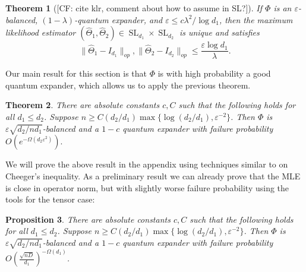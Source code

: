 \documentclass{article}
\newtheorem{theorem}{Theorem}
\newtheorem{prop}[theorem]{Proposition}
\newcommand\eps{\varepsilon}
\newcommand\SL{\operatorname{SL}}
\newcommand{\CF}[1]{{\color{purple}[CF: #1]}}
\begin{document}
\begin{theorem}[\CF{cite klr, comment about how to assume in SL?}]\label{thm:klr}
If $\Phi$ is an $\eps$-balanced, $(1 - \lambda)$-quantum expander, and $\eps \leq c \lambda^2/\log d_1$, then the maximum likelihood estimator $(\widehat{\Theta}_1, \widehat{\Theta}_2) \in \SL_{d_1}\times \SL_{d_2}$ is unique and satisfies
$$\| \widehat{\Theta}_1 - I_{d_1}\|_{op}, \| \widehat{\Theta}_2 - I_{d_2}\|_{op} \leq \frac{\eps \log d_1}{\lambda}.$$
\end{theorem}
Our main result for this section is that $\Phi$ is with high probability a good quantum expander, which allows us to apply the previous theorem. 

\begin{theorem}\label{thm:operator-cheeger}
There are absolute constants $c, C$ such that the following holds for all $d_1 \leq d_2$. Suppose $n \geq C (d_2/d_1) \max\{\log (d_2/d_1),  \eps^{-2}\} $. Then $\Phi$ is $\eps \sqrt{d_2/n d_1}$-balanced and a $1 - c$ quantum expander with failure probability $O(e^{ - \Omega( d_2 \eps^2)}).$
\end{theorem}

We will prove the above result in the appendix using techniques similar to \cite{FM20} on Cheeger's inequality. As a preliminary result we can already prove that the MLE is close in operator norm, but with slightly worse failure probability using the tools for the tensor case:

\begin{prop} \label{thm: operator-Pisier}
There are absolute constants $c, C$ such that the following holds for all $d_1 \leq d_2$. Suppose $n \geq C (d_2/d_1) \max\{\log (d_2/d_1),  \eps^{-2}\} $. Then $\Phi$ is $\eps \sqrt{d_2/n d_1}$-balanced and a $1 - c$ quantum expander with failure probability $O \left(\frac {\sqrt{nD}}{d_1}\right)^{ - \Omega(d_1)}$. 
\end{prop}
\end{document}
